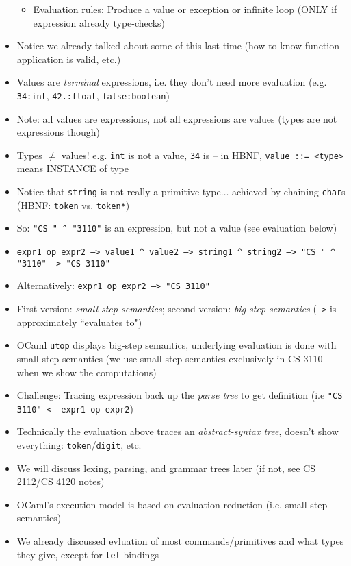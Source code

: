 \begin{itemize}
\begin{itemize}
        \item Evaluation rules: Produce a value or exception or infinite loop (ONLY if expression already type-checks)
    \end{itemize}
    \item Notice we already talked about some of this last time (how to know function application is valid, etc.)
    \item Values are \textit{terminal} expressions, i.e. they don't need more evaluation (e.g. \texttt{34:int}, \texttt{42.:float}, \texttt{false:boolean})
    \item Note: all values are expressions, not all expressions are values (types are not expressions though)
    \item Types $\neq$ values! e.g. \texttt{int} is not a value, \texttt{34} is -- in HBNF, \texttt{value ::= <type>} means INSTANCE of type
    \item Notice that \texttt{string} is not really a primitive type$\ldots$ achieved by chaining \texttt{char}s (HBNF: \texttt{token} vs. \texttt{token*})
    \item So: \texttt{"CS " \^{} "3110"} is an expression, but not a value (see evaluation below)
    \item \texttt{expr1 op expr2 --> value1 \^{} value2 --> string1 \^{} string2 --> "CS " \^{} "3110" --> "CS 3110"}
    \item Alternatively: \texttt{expr1 op expr2 --> "CS 3110"}
    \item First version: \textit{small-step semantics}; second version: \textit{big-step semantics} (\texttt{-->} is approximately ``evaluates to")
    \item \textsf{OCaml} \texttt{utop} displays big-step semantics, underlying evaluation is done with small-step semantics (we use small-step semantics exclusively in CS 3110 when we show the computations) 
    \item Challenge: Tracing expression back up the \textit{parse tree} to get definition (i.e \texttt{"CS 3110" <-- expr1 op expr2})
    \item Technically the evaluation above traces an \textit{abstract-syntax tree}, doesn't show everything: \texttt{token}/\texttt{digit}, etc.
    \item We will discuss lexing, parsing, and grammar trees later (if not, see CS 2112/CS 4120 notes)
    \item \textsf{OCaml}'s execution model is based on evaluation reduction (i.e. small-step semantics)
    \item We already discussed evluation of most commands/primitives and what types they give, except for \lstinline{let}-bindings

\end{itemize}
